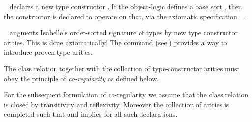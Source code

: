 \begin{isabellebody}
\begin{isamarkuptext}
\begin{description}
  \item \hyperlink{command.typedecl}{\mbox{}}~ declares a new
  type constructor .  If the object-logic defines a base sort
  , then the constructor is declared to operate on that, via
  the axiomatic specification \hyperlink{command.arities}{\mbox{}}~.

  \item \hyperlink{command.arities}{\mbox{}}~ augments
  Isabelle's order-sorted signature of types by new type constructor
  arities.  This is done axiomatically!  The \hyperlink{command.instance}{\mbox{}}
  command (see ) provides a way to introduce
  proven type arities.

  \end{description}%
\end{isamarkuptext}%
\isamarkuptrue%
%
\isamarkuptrue%
%
\begin{isamarkuptext}%
The class relation together with the collection of
  type-constructor arities must obey the principle of
  \emph{co-regularity} as defined below.

  \medskip For the subsequent formulation of co-regularity we assume
  that the class relation is closed by transitivity and reflexivity.
  Moreover the collection of arities  is
  completed such that  and 
  implies  for all such declarations.


\end{isamarkuptext}
\end{isabellebody}
